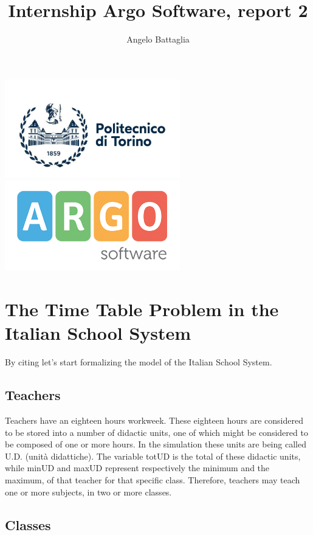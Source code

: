 \documentclass{article}
\author{Angelo Battaglia}
\title{Internship Argo Software, report 2}
\begin{document}
\maketitle

\begin{center}
\includegraphics[width=3in]{./images/polito.jpg}
\includegraphics[width=3in]{./images/og_logoargosoft.png}
\end{center}

\section{The Time Table Problem in the Italian School System}
By citing \textcite{colorni1992genetic} let's start formalizing 
the model of the Italian School System.


\subsection{Teachers}
Teachers have an eighteen hours workweek. These eighteen hours are
considered to be stored into a number of didactic units, one of which
might be considered to be composed of one or more hours. In the simulation
these units are being called U.D. (unità didattiche). The variable totUD is
the total of these didactic units, while minUD and maxUD represent respectively
the minimum and the maximum, of that teacher for that specific class. Therefore, 
teachers may teach one or more subjects, in two or more classes. 

\subsection{Classes}


\printbibliography[title = {Bibliography}]
\end{document}
